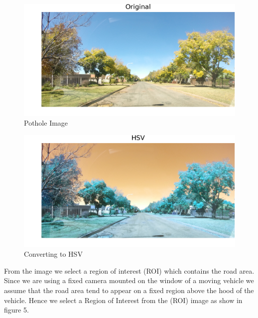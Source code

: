 \documentclass[journal]{IEEEtran}
\begin{document}
\vspace{0.5cm}

\begin{figure}[!htb]
\begin{center}
\includegraphics[scale=1]{Images/0_Original.png}
\end{center}
\caption{Pothole Image}
\end{figure}


\begin{figure}[!htb]
\begin{center}
\includegraphics[scale=1]{Images/1_HSV.png}
\end{center}
\caption{Converting to HSV}
\end{figure}

\vspace{0.5cm}

\noindent From the image we select a region of interest (ROI) which contains the road area. Since we are using a fixed camera mounted on the window of a moving vehicle we assume that the road area tend to appear on a fixed region above the hood of the vehicle. Hence we select a Region of Interest from the (ROI) image as show in figure 5.
\end{document}
